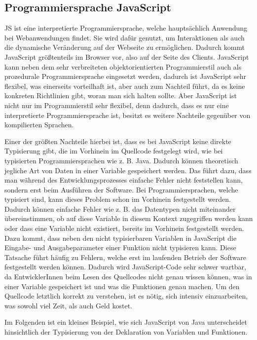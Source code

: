 \subsection{Programmiersprache JavaScript}
\label{chapter:3-javaScript}

\acl{JS} ist eine interpretierte Programmiersprache, welche hauptsächlich Anwendung bei Webanwendungen findet. Sie wird dafür genutzt, um Interaktionen als auch die dynamische Veränderung auf der Webseite zu ermöglichen. Dadurch kommt JavaScript größtenteils im Browser vor, also auf der Seite des Clients. JavaScript kann neben dem sehr verbreiteten objektorientierten Programmierstil auch als prozedurale Programmiersprache eingesetzt werden, dadurch ist JavaScript sehr flexibel, was einerseits vorteilhaft ist, aber auch zum Nachteil führt, da es keine konkreten Richtlinien gibt, woran man sich halten sollte. Aber JavaScript ist nicht nur im Programmierstil sehr flexibel, denn dadurch, dass es nur eine interpretierte Programmiersprache ist, besitzt es weitere Nachteile gegenüber von kompilierten Sprachen.

Einer der größten Nachteile hierbei ist, dass es bei JavaScript keine direkte Typisierung gibt, die im Vorhinein im Quellcode festgelegt wird, wie bei typisierten Programmiersprachen wie z. B. Java. Dadurch können theoretisch jegliche Art von Daten in einer Variable gespeichert werden. Das führt dazu, dass man während des Entwicklungsprozesses einfache Fehler nicht feststellen kann, sondern erst beim Ausführen der Software.
Bei Programmiersprachen, welche typisiert sind, kann dieses Problem schon im Vorhinein festgestellt werden. Dadurch können einfache Fehler wie z. B. das Datentypen nicht miteinander übereinstimmen, ob auf diese Variable in diesem Kontext zugegriffen werden kann oder dass eine Variable nicht existiert, bereits im Vorhinein festgestellt werden. Dazu kommt, dass neben den nicht typisierbaren Variablen in JavaScript die Eingabe- und Ausgabeparameter einer Funktion nicht typisieren kann. Diese Tatsache führt häufig zu Fehlern, welche erst im laufenden Betrieb der Software festgestellt werden können. Dadurch wird JavaScript-Code sehr schwer wartbar, da EntwicklerInnen beim Lesen des Quellcodes nicht genau wissen können, was in einer Variable gespeichert ist und was die Funktionen genau machen. Um den Quellcode letztlich korrekt zu verstehen, ist es nötig, sich intensiv einzuarbeiten, was sowohl viel Zeit, als auch Geld kostet.

Im Folgenden ist ein kleines Beispiel, wie sich JavaScript von Java unterscheidet hinsichtlich der Typisierung von der Deklaration von Variablen und Funktionen.


